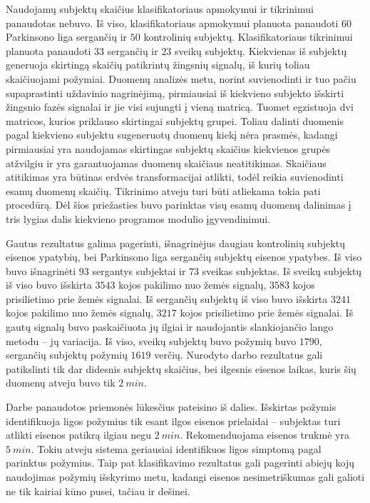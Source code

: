 \documentclass[]{vgtuef}
\begin{document}
Naudojamų subjektų skaičius klasifikatoriaus apmokymui ir tikrinimui panaudotas nebuvo. Iš viso, klasifikatoriaus apmokymui planuota panaudoti $60$ Parkinsono liga sergančių ir $50$ kontrolinių subjektų. Klasifikatoriaus tikrinimui planuota panaudoti $33$ sergančių ir $23$ sveikų subjektų. Kiekvienas iš subjektų generuoja skirtingą skaičių patikrintų žingsnių signalų, iš kurių toliau skaičiuojami požymiai. Duomenų analizės metu, norint suvienodinti ir tuo pačiu supaprastinti uždavinio nagrinėjimą, pirmiausiai iš kiekvieno subjekto išskirti žingsnio fazės signalai ir jie visi sujungti į vieną matricą. Tuomet egzistuoja dvi matricos, kurios priklauso skirtingai subjektų grupei. Toliau dalinti duomenis pagal kiekvieno subjektu sugeneruotų duomenų kiekį nėra prasmės, kadangi pirmiausiai yra naudojamas skirtingas subjektų skaičius kiekvienos grupės atžvilgiu ir yra garantuojamas duomenų skaičiaus neatitikimas. Skaičiaus atitikimas yra būtinas erdvės transformacijai atlikti, todėl reikia suvienodinti esamų duomenų skaičių. Tikrinimo atveju turi būti atliekama tokia pati procedūrą. Dėl šios priežasties buvo parinktas visų esamų duomenų dalinimas į tris lygias dalis kiekvieno programos modulio įgyvendinimui.


Gautus rezultatus galima pagerinti, išnagrinėjus daugiau kontrolinių subjektų eisenos ypatybių, bei Parkinsono liga sergančių subjektų eisenos ypatybes. Iš viso buvo išnagrinėti $93$ sergantys subjektai ir $73$ sveikas subjektas. Iš sveikų subjektų iš viso buvo išskirta $3543$ kojos pakilimo nuo žemės signalų, $3583$ kojos prisilietimo prie žemės signalai. Iš sergančių subjektų iš viso buvo išskirta $3241$ kojos pakilimo nuo žemės signalų, $3217$ kojos prisilietimo prie žemės signalai. Iš gautų signalų buvo paskaičiuota jų ilgiai ir naudojantis slankiojančio lango metodu -- jų variacija. Iš viso, sveikų subjektų buvo požymių buvo $1790$, sergančių subjektų požymių $1619$ verčių. Nurodyto darbo rezultatus gali patikslinti tik dar didesnis subjektų skaičius, bei ilgesnis eisenos laikas, kuris šių duomenų atveju buvo tik $2~min$.


Darbe panaudotos priemonės lūkesčius pateisino iš dalies. Išskirtas požymis identifikuoja ligos požymius tik esant ilgos eisenos prielaidai -- subjektas turi atlikti eisenos patikrą ilgiau negu $2~min$. Rekomenduojama eisenos trukmė yra $5~min$. Tokiu atveju sistema geriausiai identifikuos ligos simptomą pagal parinktus požymius. Taip pat klasifikavimo rezultatus gali pagerinti abiejų kojų naudojimas požymių išskyrimo metu, kadangi eisenos nesimetriškumas gali galioti ne tik kairiai kūno pusei, tačiau ir dešinei.
\end{document}

